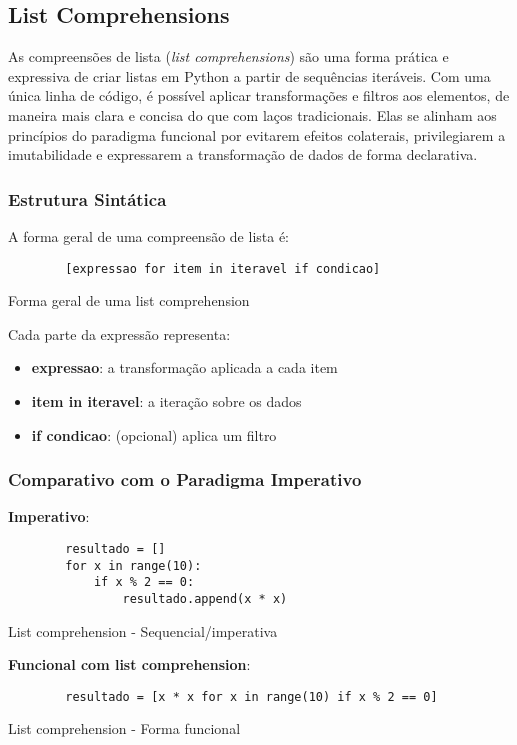 \subsection{List Comprehensions}
As compreensões de lista (\textit{list comprehensions}) são uma forma prática e expressiva de criar listas em Python a partir de sequências iteráveis. Com uma única linha de código, é possível aplicar transformações e filtros aos elementos, de maneira mais clara e concisa do que com laços tradicionais. Elas se alinham aos princípios do paradigma funcional por evitarem efeitos colaterais, privilegiarem a imutabilidade e expressarem a transformação de dados de forma declarativa.

\subsubsection{Estrutura Sintática}
A forma geral de uma compreensão de lista é:

\begin{listing}[!ht]
    \begin{verbatim}
        [expressao for item in iteravel if condicao]
    \end{verbatim}
    \caption{Forma geral de uma list comprehension}
    \label{listing:2}
\end{listing}

Cada parte da expressão representa:
\begin{itemize}
    \item \textbf{expressao}: a transformação aplicada a cada item
    \item \textbf{item in iteravel}: a iteração sobre os dados
    \item \textbf{if condicao}: (opcional) aplica um filtro
\end{itemize}

\subsubsection{Comparativo com o Paradigma Imperativo}
\textbf{Imperativo}:

\begin{listing}[!ht]
    \begin{verbatim}
        resultado = []
        for x in range(10):
            if x % 2 == 0:
                resultado.append(x * x)
    \end{verbatim}
    \caption{List comprehension - Sequencial/imperativa}
    \label{listing:2}
\end{listing}
\textbf{Funcional com list comprehension}:
\begin{listing}[!ht]
    \begin{verbatim}
        resultado = [x * x for x in range(10) if x % 2 == 0]
    \end{verbatim}
    \caption{List comprehension - Forma funcional}
    \label{listing:2}
\end{listing}

